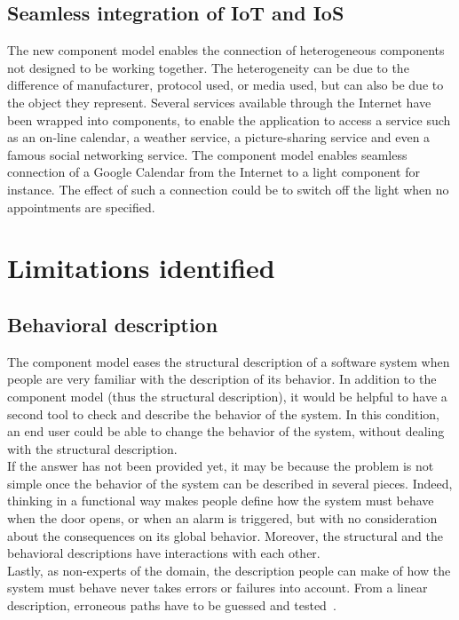 \subsection{Seamless integration of IoT and IoS}
The new component model enables the connection of heterogeneous components not designed to be working together. The heterogeneity can be due to the difference of manufacturer, protocol used, or media used, but can also be due to the object they represent. Several services available through the Internet have been wrapped into components, to enable the application to access a service such as an on-line calendar, a weather service, a picture-sharing service and even a famous social networking service. The component model enables seamless connection of a Google Calendar from the Internet to a light component for instance. The effect of such a connection could be to switch off the light when no appointments are specified.


\section{Limitations identified}

\subsection{Behavioral description}

The component model eases the structural description of a software system when people are very familiar with the description of its behavior. In addition to the component model (thus the structural description), it would be helpful to have a second tool to check and describe the behavior of the system. In this condition, an end user could be able to change the behavior of the system, without dealing with the structural description.\\
If the answer has not been provided yet, it may be because the problem is not simple once the behavior of the system can be described in several pieces. Indeed, thinking in a functional way makes people define how the system must behave when the door opens, or when an alarm is triggered, but with no consideration about the consequences on its global behavior. Moreover, the structural and the behavioral descriptions have interactions with each other.\\
Lastly, as non-experts of the domain, the description people can make of how the system must behave never takes errors or failures into account. From a linear description, erroneous paths have to be guessed and tested~\cite{Offutt:1997}.

